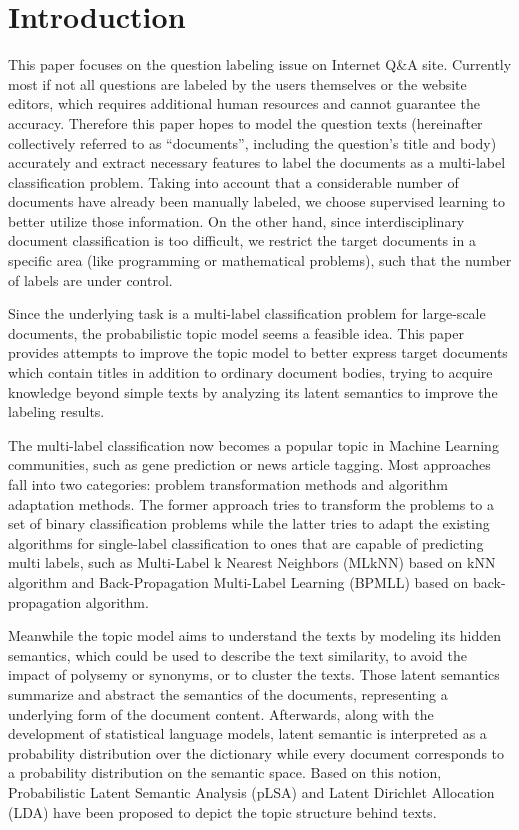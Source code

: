 \section{Introduction}
\label{sec:intro}

This paper focuses on the question labeling issue on Internet Q\&A site. Currently most if not all questions are labeled by the users themselves or the website editors, which requires additional human resources and cannot guarantee the accuracy. Therefore this paper hopes to model the question texts (hereinafter collectively referred to as ``documents'', including the question's title and body) accurately and extract necessary features to label the documents as a multi-label classification problem. Taking into account that a considerable number of documents have already been manually labeled, we choose supervised learning to better utilize those information. On the other hand, since interdisciplinary document classification is too difficult, we restrict the target documents in a specific area (like programming or mathematical problems), such that the number of labels are under control.

Since the underlying task is a multi-label classification problem for large-scale documents, the probabilistic topic model seems a feasible idea. This paper provides attempts to improve the topic model to better express target documents which contain titles in addition to ordinary document bodies, trying to acquire knowledge beyond simple texts by analyzing its latent semantics to improve the labeling results.

The multi-label classification now becomes a popular topic in Machine Learning communities, such as gene prediction or news article tagging. Most approaches fall into two categories: problem transformation methods and algorithm adaptation methods.  The former approach tries to transform the problems to a set of binary classification problems while the latter tries to adapt the existing algorithms for single-label classification to ones that are capable of predicting multi labels, such as Multi-Label k Nearest Neighbors (MLkNN) \cite{zhang2007ml} based on kNN algorithm and Back-Propagation Multi-Label Learning (BPMLL) \cite{zhang2006multilabel} based on back-propagation algorithm.

Meanwhile the topic model aims to understand the texts by modeling its hidden semantics, which could be used to describe the text similarity, to avoid the impact of polysemy or synonyms, or to cluster the texts. Those latent semantics summarize and abstract the semantics of the documents, representing a underlying form of the document content. Afterwards, along with the development of statistical language models, latent semantic is interpreted as a probability distribution over the dictionary while every document corresponds to a probability distribution on the semantic space. Based on this notion, Probabilistic Latent Semantic Analysis (pLSA)\cite{hofmann1999probabilistic} and Latent Dirichlet Allocation (LDA)\cite{blei2003latent} have been proposed to depict the topic structure behind texts.


